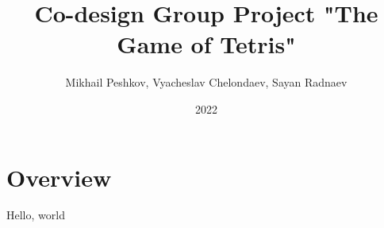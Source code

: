 \documentclass[12pt, a4paper, twoside]{article}
\title{Co-design Group Project \newline "The Game of Tetris"}
\author{Mikhail Peshkov, Vyacheslav Chelondaev, Sayan Radnaev}
\date{2022}
\begin{document}
\maketitle
\newpage
\section{Overview}
Hello, world
\end{document}
